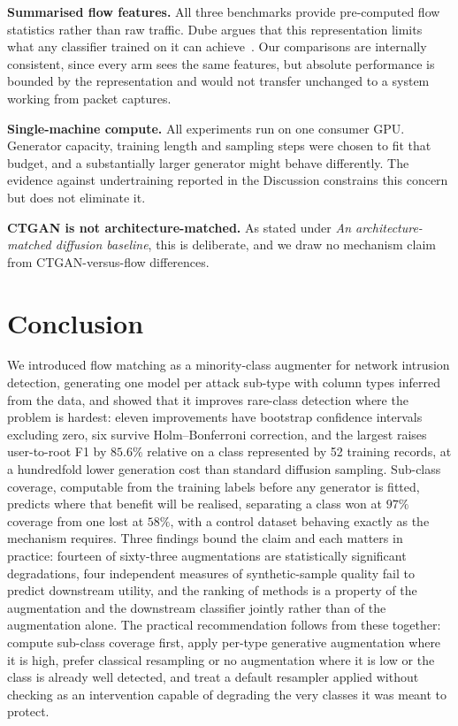 \documentclass[11pt]{article}
\begin{document}
\noindent\textbf{Summarised flow features.} All three benchmarks provide pre-computed flow statistics rather than raw traffic. Dube argues that this representation limits what any classifier trained on it can achieve~\cite{dube2024faulty}. Our comparisons are internally consistent, since every arm sees the same features, but absolute performance is bounded by the representation and would not transfer unchanged to a system working from packet captures.

\noindent\textbf{Single-machine compute.} All experiments run on one consumer GPU. Generator
capacity, training length and sampling steps were chosen to fit that budget, and a
substantially larger generator might behave differently. The evidence against
undertraining reported in the Discussion constrains this concern but
does not eliminate it.

\noindent\textbf{CTGAN is not architecture-matched.} As stated under \emph{An architecture-matched diffusion baseline}, this is deliberate, and we draw no mechanism claim
from CTGAN-versus-flow differences.

\section*{Conclusion}

We introduced flow matching as a minority-class augmenter for network
intrusion detection, generating one model per attack sub-type with column types
inferred from the data, and showed that it improves rare-class detection where the
problem is hardest: eleven improvements have bootstrap confidence intervals excluding
zero, six survive Holm--Bonferroni correction, and the largest raises user-to-root F1
by $85.6\%$ relative on a class represented by 52 training records, at a
hundredfold lower generation cost than standard diffusion sampling. Sub-class
coverage, computable from the training labels before any generator is fitted,
predicts where that benefit will be realised, separating a class won at $97\%$
coverage from one lost at $58\%$, with a control dataset behaving exactly as the
mechanism requires. Three findings bound the claim and each matters in practice:
fourteen of sixty-three augmentations are statistically significant degradations,
four independent measures of synthetic-sample quality fail to predict downstream
utility, and the ranking of methods is a property of the augmentation and the
downstream classifier jointly rather than of the augmentation alone. The practical
recommendation follows from these together: compute sub-class coverage first, apply
per-type generative augmentation where it is high, prefer classical resampling or no
augmentation where it is low or the class is already well detected, and treat a
default resampler applied without checking as an intervention capable of degrading
the very classes it was meant to protect.
\end{document}
